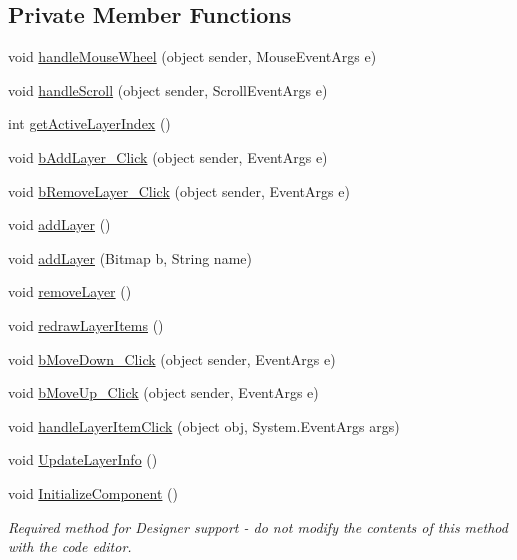 \subsection*{Private Member Functions}
\begin{DoxyCompactItemize}
\item 
void \mbox{\hyperlink{class_paint___program_1_1_layer_view_ae37145bc09093999c35a5ed4cfd0b4f4}{handle\+Mouse\+Wheel}} (object sender, Mouse\+Event\+Args e)
\item 
void \mbox{\hyperlink{class_paint___program_1_1_layer_view_a4f472408447efa4b42636652e8e6543c}{handle\+Scroll}} (object sender, Scroll\+Event\+Args e)
\item 
int \mbox{\hyperlink{class_paint___program_1_1_layer_view_a530e1b907d4d7170ed2bb4458142ab4e}{get\+Active\+Layer\+Index}} ()
\item 
void \mbox{\hyperlink{class_paint___program_1_1_layer_view_a5a79b6f0d42626db4e46740ba7acd3d6}{b\+Add\+Layer\+\_\+\+Click}} (object sender, Event\+Args e)
\item 
void \mbox{\hyperlink{class_paint___program_1_1_layer_view_a9113020298ddd2453ded7a2c9f290f25}{b\+Remove\+Layer\+\_\+\+Click}} (object sender, Event\+Args e)
\item 
void \mbox{\hyperlink{class_paint___program_1_1_layer_view_ae9cf7ac141487ef8296aa8982f36dd4b}{add\+Layer}} ()
\item 
void \mbox{\hyperlink{class_paint___program_1_1_layer_view_aa7d7b70619b86d67ed2e86b94df5da89}{add\+Layer}} (Bitmap b, String name)
\item 
void \mbox{\hyperlink{class_paint___program_1_1_layer_view_ac0005cdabdf8818860cc85ec9a9620c7}{remove\+Layer}} ()
\item 
void \mbox{\hyperlink{class_paint___program_1_1_layer_view_a3aea3b23c16f637b1e71c6e124c0d1ed}{redraw\+Layer\+Items}} ()
\item 
void \mbox{\hyperlink{class_paint___program_1_1_layer_view_ae1c2bd86cca19963e75832b53810f39f}{b\+Move\+Down\+\_\+\+Click}} (object sender, Event\+Args e)
\item 
void \mbox{\hyperlink{class_paint___program_1_1_layer_view_af33e0c3be1c72f6893591068f1735f6c}{b\+Move\+Up\+\_\+\+Click}} (object sender, Event\+Args e)
\item 
void \mbox{\hyperlink{class_paint___program_1_1_layer_view_a61a0b7470102d6ce9f9e306f703aac1a}{handle\+Layer\+Item\+Click}} (object obj, System.\+Event\+Args args)
\item 
void \mbox{\hyperlink{class_paint___program_1_1_layer_view_af4ccbb4bfa3763c0a1f5de15ff56b7d9}{Update\+Layer\+Info}} ()
\item 
void \mbox{\hyperlink{class_paint___program_1_1_layer_view_ab1fd7e88ea143f00447d961a8a77d9a9}{Initialize\+Component}} ()
\begin{DoxyCompactList}\small\item\em Required method for Designer support -\/ do not modify the contents of this method with the code editor. \end{DoxyCompactList}\end{DoxyCompactItemize}
